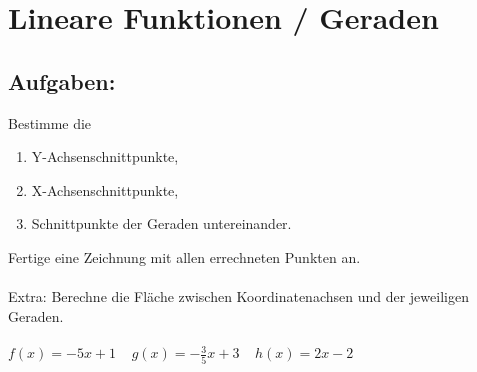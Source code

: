 



\section*{Lineare Funktionen / Geraden}
\subsection*{Aufgaben:}
Bestimme die
\begin{enumerate}
      \item Y-Achsenschnittpunkte,
      \item X-Achsenschnittpunkte,
      \item Schnittpunkte der Geraden untereinander.
\end{enumerate}
Fertige eine Zeichnung mit allen errechneten Punkten an.\\\\
Extra: Berechne die Fläche zwischen Koordinatenachsen und der jeweiligen Geraden.
\\\\
$f(x)=-5x+1 \;\;\;\; g(x)=-\frac{3}{5}x+3 \;\;\;\; h(x)=2x-2$

